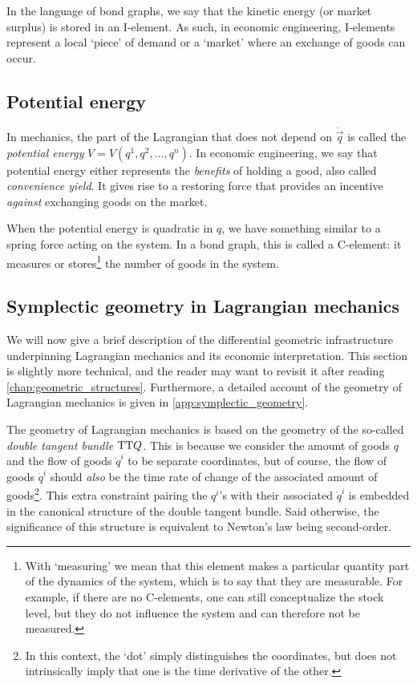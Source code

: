 In the language of bond graphs, we say that the kinetic energy (or market surplus) is stored in an I-element. As such, in economic engineering, I-elements represent a local `piece' of demand or a `market' where an exchange of goods can occur.

\subsection{Potential energy} In mechanics, the part of the Lagrangian that does not depend on \(\dot{\vec{q}}\) is called the \emph{potential energy} \(V = V(q^1, q^2, \ldots, q^n)\). In economic engineering, we say that potential energy either represents the \emph{benefits} of holding a good, also called \emph{convenience yield}. It gives rise to a restoring force that provides an incentive \emph{against} exchanging goods on the market.  

When the potential energy is quadratic in \(q\), we have something similar to a spring force acting on the system. In a bond graph, this is called a C-element: it measures or stores\footnote{With `measuring' we mean that this element makes a particular quantity part of the dynamics of the system, which is to say that they are measurable. For example, if there are no C-elements, one can still conceptualize the stock level, but they do not influence the system and can therefore not be measured.} the number of goods in the system.

\subsection{Symplectic geometry in Lagrangian mechanics} 
We will now give a brief description of the differential geometric infrastructure underpinning Lagrangian mechanics and its economic interpretation. This section is slightly more technical, and the reader may want to revisit it after reading \cref{chap:geometric_structures}. 
Furthermore, a detailed account of the geometry of Lagrangian mechanics is given in  \cref{app:symplectic_geometry}. 

The geometry of Lagrangian mechanics is based on the geometry of the so-called \emph{double tangent bundle} \(\mathrm{T}\mathrm{T}Q\). This is because we consider the amount of goods \(q\) and the flow of goods \(\dot{q}^i\) to be separate coordinates, but of course, the flow of goods \(\dot{q}^i\) should \emph{also} be the time rate of change of the associated amount of goods\footnote{In this context, the `dot' simply distinguishes the coordinates, but does not intrinsically imply that one is the time derivative of the other.}. This extra constraint pairing the \(q^i\)'s with their associated \(\dot{q}^i\) is embedded in the canonical structure of the double tangent bundle. Said otherwise, the significance of this structure is equivalent to Newton's law being second-order.


